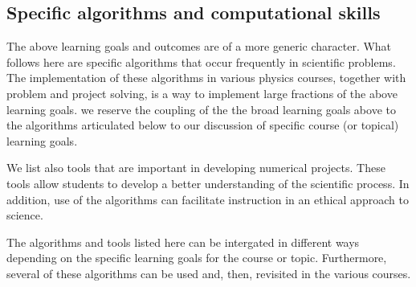 \documentclass[%
oneside,                 %
final,                   %
10pt]{article}
\begin{document}
\noindent
\subsection{Specific algorithms and computational skills}

The above learning goals and outcomes are of a more generic character. What follows here are specific
algorithms that occur frequently in scientific problems. The implementation of these algorithms in various physics courses, together with problem and project solving, is a way to implement large fractions of the above learning goals. we reserve the coupling of the the broad learning goals above to the algorithms articulated below to our discussion of specific course (or topical) learning goals.

We list also tools that are important in developing
numerical projects. These tools allow students to develop a better understanding of the scientific process. In addition, use of the algorithms can facilitate instruction in an ethical approach to science.

The algorithms and tools listed here can be intergated in different ways depending on the specific learning goals for the course or topic. Furthermore, several of these algorithms can be used and, then, revisited in the various courses.
\end{document}
